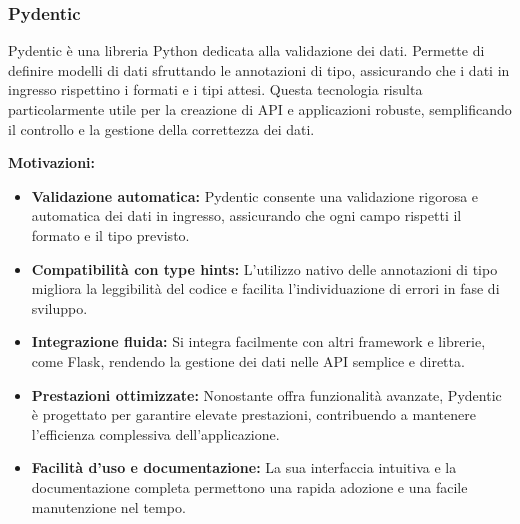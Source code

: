 \subsubsection{Pydentic}
\label{subsubsec:pydentic}

Pydentic è una libreria Python dedicata alla validazione dei dati. Permette di definire modelli di dati sfruttando le annotazioni di tipo, assicurando che i dati in ingresso rispettino i formati e i tipi attesi. Questa tecnologia risulta particolarmente utile per la creazione di API e applicazioni robuste, semplificando il controllo e la gestione della correttezza dei dati.

\textbf{Motivazioni:}
\begin{itemize}
    \item \textbf{Validazione automatica:} Pydentic consente una validazione rigorosa e automatica dei dati in ingresso, assicurando che ogni campo rispetti il formato e il tipo previsto.
    \item \textbf{Compatibilità con type hints:} L'utilizzo nativo delle annotazioni di tipo migliora la leggibilità del codice e facilita l'individuazione di errori in fase di sviluppo.
    \item \textbf{Integrazione fluida:} Si integra facilmente con altri framework e librerie, come Flask, rendendo la gestione dei dati nelle API semplice e diretta.
    \item \textbf{Prestazioni ottimizzate:} Nonostante offra funzionalità avanzate, Pydentic è progettato per garantire elevate prestazioni, contribuendo a mantenere l'efficienza complessiva dell'applicazione.
    \item \textbf{Facilità d'uso e documentazione:} La sua interfaccia intuitiva e la documentazione completa permettono una rapida adozione e una facile manutenzione nel tempo.
\end{itemize}